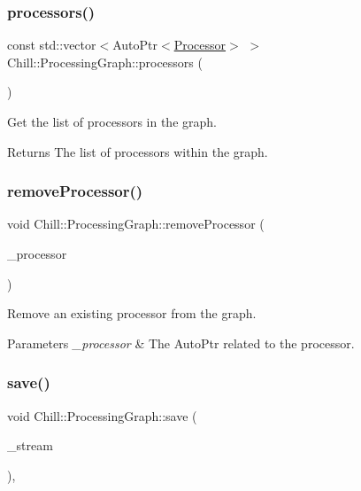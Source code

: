 \subsubsection{\texorpdfstring{processors()}{processors()}}
{\footnotesize\ttfamily const std\+::vector$<$Auto\+Ptr$<$\mbox{\hyperlink{class_chill_1_1_processor}{Processor}}$>$ $>$ Chill\+::\+Processing\+Graph\+::processors (\begin{DoxyParamCaption}{ }\end{DoxyParamCaption})\hspace{0.3cm}{\ttfamily [inline]}}

Get the list of processors in the graph. \begin{DoxyReturn}{Returns}
The list of processors within the graph. 
\end{DoxyReturn}
\mbox{\label{class_chill_1_1_processing_graph_a7fe61b40e3ef530f9684600f3a93f53f}} 
\subsubsection{\texorpdfstring{remove\+Processor()}{removeProcessor()}}
{\footnotesize\ttfamily void Chill\+::\+Processing\+Graph\+::remove\+Processor (\begin{DoxyParamCaption}\item[{Auto\+Ptr$<$ \mbox{\hyperlink{class_chill_1_1_processor}{Processor}} $>$ \&}]{\+\_\+processor }\end{DoxyParamCaption})}

Remove an existing processor from the graph. 
\begin{DoxyParams}{Parameters}
{\em \+\_\+processor} & The Auto\+Ptr related to the processor. \\
\hline
\end{DoxyParams}
\mbox{\label{class_chill_1_1_processing_graph_a15ebc74e61a5bbdba8715c8d93b2815d}} 
\subsubsection{\texorpdfstring{save()}{save()}}
{\footnotesize\ttfamily void Chill\+::\+Processing\+Graph\+::save (\begin{DoxyParamCaption}\item[{std\+::ofstream \&}]{\+\_\+stream }\end{DoxyParamCaption})\hspace{0.3cm}{\ttfamily [inline]}, {\ttfamily [virtual]}}

